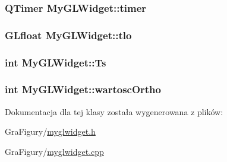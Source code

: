 \hypertarget{classMyGLWidget_a5b154232ee1d21cc8b034e28798a5245}{
\subsubsection[{timer}]{\setlength{\rightskip}{0pt plus 5cm}Q\-Timer My\-G\-L\-Widget\-::timer\hspace{0.3cm}{\ttfamily [protected]}}}\label{classMyGLWidget_a5b154232ee1d21cc8b034e28798a5245}
\hypertarget{classMyGLWidget_a8d0f06e3361addec1ba11fe317de2c60}{
\subsubsection[{tlo}]{\setlength{\rightskip}{0pt plus 5cm}G\-Lfloat My\-G\-L\-Widget\-::tlo\hspace{0.3cm}{\ttfamily [protected]}}}\label{classMyGLWidget_a8d0f06e3361addec1ba11fe317de2c60}
\hypertarget{classMyGLWidget_a0c89380896bd79421cd4c6fcae3e0e18}{
\subsubsection[{Ts}]{\setlength{\rightskip}{0pt plus 5cm}int My\-G\-L\-Widget\-::\-Ts\hspace{0.3cm}{\ttfamily [protected]}}}\label{classMyGLWidget_a0c89380896bd79421cd4c6fcae3e0e18}
\hypertarget{classMyGLWidget_a2a7fab72a9434ab8a32f67768f758011}{
\subsubsection[{wartosc\-Ortho}]{\setlength{\rightskip}{0pt plus 5cm}int My\-G\-L\-Widget\-::wartosc\-Ortho\hspace{0.3cm}{\ttfamily [protected]}}}\label{classMyGLWidget_a2a7fab72a9434ab8a32f67768f758011}


Dokumentacja dla tej klasy została wygenerowana z plików\-:\begin{DoxyCompactItemize}
\item 
Gra\-Figury/\hyperlink{GraFigury_2myglwidget_8h}{myglwidget.\-h}\item 
Gra\-Figury/\hyperlink{GraFigury_2myglwidget_8cpp}{myglwidget.\-cpp}\end{DoxyCompactItemize}
